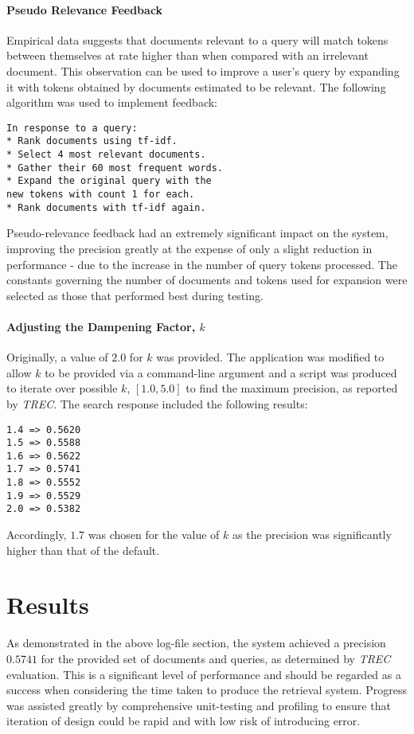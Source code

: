 \documentclass[10pt, a4paper, twocolumn]{article}   	%
\begin{document}
\paragraph{Pseudo Relevance Feedback}
Empirical data suggests that documents relevant to a query will match tokens between themselves at rate higher than when compared with an irrelevant document. This observation can be used to improve a user's query by expanding it with tokens obtained by documents estimated to be relevant.
The following algorithm was used to implement feedback:
\begin{verbatim}
In response to a query:
* Rank documents using tf-idf.
* Select 4 most relevant documents.
* Gather their 60 most frequent words.
* Expand the original query with the
new tokens with count 1 for each.
* Rank documents with tf-idf again.
\end{verbatim}
Pseudo-relevance feedback had an extremely significant impact on the system, improving the precision greatly at the expense of only a slight reduction in performance - due to the increase in the number of query tokens processed. The constants governing the number of documents and tokens used for expansion were selected as those that performed best during testing.

\paragraph{Adjusting the Dampening Factor, $k$}
Originally, a value of $2.0$ for $k$ was provided. The application was modified to allow $k$ to be provided via a command-line argument and a script was produced to iterate over possible $k$, $[1.0, 5.0]$ to find the maximum precision, as reported by \emph{TREC}.
The search response included the following results:
\begin{verbatim}
1.4 => 0.5620
1.5 => 0.5588
1.6 => 0.5622
1.7 => 0.5741
1.8 => 0.5552
1.9 => 0.5529
2.0 => 0.5382
\end{verbatim}
Accordingly, $1.7$ was chosen for the value of $k$ as the precision was significantly higher than that of the default.
\section{Results}
As demonstrated in the above log-file section, the system achieved a precision $0.5741$ for the provided set of documents and queries, as determined by \emph{TREC} evaluation.
This is a significant level of performance and should be regarded as a success when considering the time taken to produce the retrieval system. Progress was assisted greatly by comprehensive unit-testing and profiling to ensure that iteration of design could be rapid and with low risk of introducing error.
\end{document}
